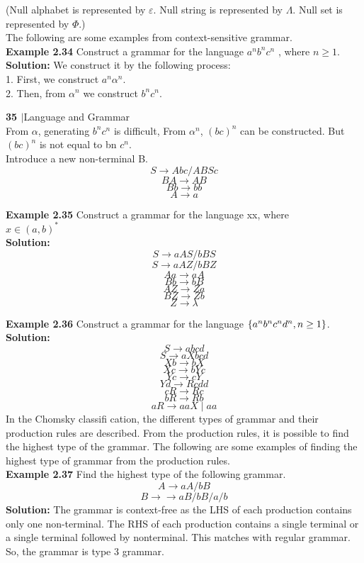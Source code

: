 \documentclass[12pt]{book}
\begin{document}
(Null alphabet is represented by $\varepsilon$. Null string is represented by $\Lambda$. Null set is represented by $\Phi$.)\\
The following are some examples from context-sensitive grammar.\\
\textbf{\large Example 2.34} Construct a grammar for the language $a^nb^nc^n$
, where $n \geq 1$.\\

\textbf{Solution:} We construct it by the following process:\\
1. First, we construct $a^n\alpha^n$.\\
2. Then, from $\alpha^n$ we construct $b^nc^n$. 







\textbf{35 $\boldsymbol{\mid}$}Language and Grammar\\
From $\alpha$, generating $b^nc^n$ is difficult, From $\alpha^n$, $(bc)^n$
can be constructed. But $(bc)^n$ is not equal to bn
$c^n$. \\
Introduce a new non-terminal B.\\
\[S \rightarrow Abc/ABSc\]
\[BA \rightarrow AB\]
\[Bb \rightarrow bb\]
\[A \rightarrow a\]

\textbf{\large Example 2.35} Construct a grammar for the language xx, where\\ $x \in (a, b)^* $\\
\textbf{Solution:}
\[S \rightarrow aAS/bBS\]
\[S \rightarrow aAZ/bBZ\]
\[Aa \rightarrow aA\]
\[Bb \rightarrow bB\]
\[AZ \rightarrow Za\]
\[BZ \rightarrow Zb\]
\[Z \rightarrow \lambda \]

\textbf{\large Example 2.36} Construct a grammar for the language $\{a^nb^nc^nd^n,\\ n\geq1\}$.\\
\textbf{Solution:}
\[S \rightarrow abcd\]
\[S \rightarrow aXbcd\]
\[Xb \rightarrow bX\]
\[Xc \rightarrow bYc\]
\[Yc \rightarrow cY\]
\[Yd \rightarrow Rcdd\]
\[cR \rightarrow Rc\]
\[bR \rightarrow Rb\]
\[aR \rightarrow aaX \mid aa\]
In the Chomsky classifi cation, the different types of grammar and their production rules are
described. 
From the production rules, it is possible to find the highest type of the grammar. The following
are some 
examples of finding the highest type of grammar from the production rules.\\

\textbf{\large Example 2.37} Find the highest type of the following grammar. \\
\[A \rightarrow aA/bB\]
\[B →\rightarrow aB/bB/a/b\]
\textbf{Solution:} The grammar is context-free as the LHS of each production contains only one
non-terminal.
The RHS of each production contains a single terminal or a single terminal followed by nonterminal. 
This matches with regular grammar. So, the grammar is type 3 grammar. \\
\end{document}
